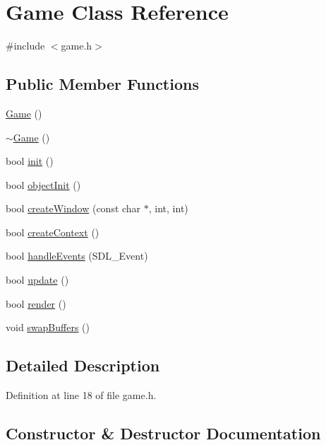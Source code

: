 \hypertarget{class_game}{}\section{Game Class Reference}
\label{class_game}


{\ttfamily \#include $<$game.\+h$>$}

\subsection*{Public Member Functions}
\begin{DoxyCompactItemize}
\item 
\hyperlink{class_game_ad59df6562a58a614fda24622d3715b65}{Game} ()
\item 
\hyperlink{class_game_ae3d112ca6e0e55150d2fdbc704474530}{$\sim$\+Game} ()
\item 
bool \hyperlink{class_game_a8ff3a6838bad4ea9493c103f96d7bff3}{init} ()
\item 
bool \hyperlink{class_game_ad6eb621ba94b849e13ea89e8adc5692a}{object\+Init} ()
\item 
bool \hyperlink{class_game_ab31b2a70de036dcdd67221dbcc6288de}{create\+Window} (const char $\ast$, int, int)
\item 
bool \hyperlink{class_game_aa0760fcf071caa67545b9ec23635ffbe}{create\+Context} ()
\item 
bool \hyperlink{class_game_ad6de67415ab8c9e92fe9f44145c68b72}{handle\+Events} (S\+D\+L\+\_\+\+Event)
\item 
bool \hyperlink{class_game_a5226f890e2733208c248c97f49e351f5}{update} ()
\item 
bool \hyperlink{class_game_af0bedb9e790940efdf41be562deb544d}{render} ()
\item 
void \hyperlink{class_game_a57b742722cf4904cc32a0bbdef8ab128}{swap\+Buffers} ()
\end{DoxyCompactItemize}


\subsection{Detailed Description}


Definition at line 18 of file game.\+h.



\subsection{Constructor \& Destructor Documentation}
\hypertarget{class_game_ad59df6562a58a614fda24622d3715b65}{}
